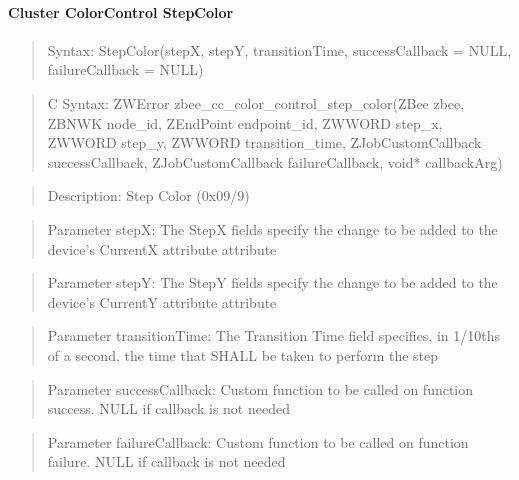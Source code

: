 \paragraph{Cluster ColorControl StepColor}
\begin{quote}Syntax: StepColor(stepX, stepY, transitionTime, successCallback = NULL, failureCallback = NULL)\end{quote}
\begin{quote}C Syntax: ZWError zbee\_cc\_color\_control\_step\_color(ZBee zbee, ZBNWK node\_id, ZEndPoint endpoint\_id, ZWWORD step\_x, ZWWORD step\_y, ZWWORD transition\_time, ZJobCustomCallback successCallback, ZJobCustomCallback failureCallback, void* callbackArg)\end{quote}
\begin{quote}Description: Step Color (0x09/9)\end{quote}
\begin{quote}Parameter stepX: The StepX fields specify the change to be added to the device's CurrentX attribute attribute\end{quote}
\begin{quote}Parameter stepY: The StepY fields specify the change to be added to the device's CurrentY attribute attribute\end{quote}
\begin{quote}Parameter transitionTime: The Transition Time field specifies, in 1/10ths of a second, the time that SHALL be taken to perform the step\end{quote}
\begin{quote}Parameter successCallback: Custom function to be called on function success. NULL if callback is not needed\end{quote}
\begin{quote}Parameter failureCallback: Custom function to be called on function failure. NULL if callback is not needed\end{quote}


